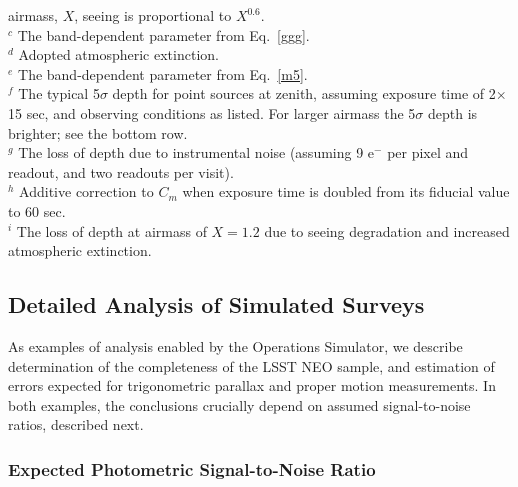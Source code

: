 \begin{table}
           airmass, $X$, seeing is proportional to $X^{0.6}$. \\
  $^c$ The band-dependent parameter from Eq.~\ref{ggg}. \\
  $^d$ Adopted atmospheric extinction. \\
  $^e$ The band-dependent parameter from Eq.~\ref{m5}. \\
  $^f$ The typical 5$\sigma$ depth for point sources at zenith, assuming exposure time of
          2$\times$15 sec, and observing conditions as listed. For larger
          airmass the 5$\sigma$ depth is brighter; see the bottom row. \\
  $^g$ The loss of depth due to instrumental noise (assuming 9 e$^-$ per pixel and readout,
       and two readouts per visit). \\
  $^h$ Additive correction to $C_m$ when exposure time is doubled from its fiducial value
          to 60 sec. \\
  $^i$ The loss of depth at airmass of $X=1.2$ due to seeing degradation
                 and increased atmospheric extinction. \\
\end{table}






\subsection{  Detailed Analysis of Simulated Surveys  }

As examples of analysis enabled by the Operations Simulator, we describe
determination of the completeness of the LSST NEO sample, and estimation
of errors expected for trigonometric parallax and proper motion measurements.
In both examples, the conclusions crucially depend on assumed signal-to-noise
ratios, described next.

\subsubsection{  Expected Photometric Signal-to-Noise Ratio }

